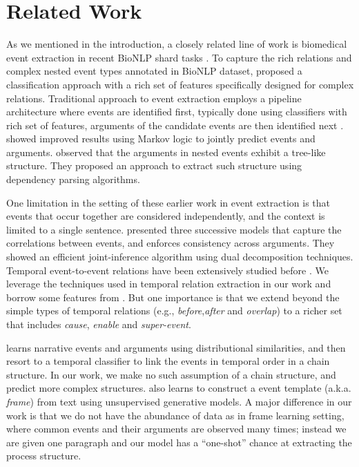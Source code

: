 \section{Related Work}
As we mentioned in the introduction, a closely related line of work is biomedical event extraction in recent BioNLP shard tasks \cite{kim09,kim11}. 
To capture the rich relations and complex nested event types annotated in BioNLP dataset,  proposed a classification approach with a rich set of features specifically designed for complex relations. 
Traditional approach to event extraction employs a pipeline architecture where events are identified first, typically done using classifiers with rich set of features\cite{Miwa10}, arguments of the candidate events are then identified next \cite{Bjorne11}. 
 showed improved results using Markov logic to jointly predict events and arguments. 
 observed that the arguments in nested events exhibit a tree-like structure. They proposed an approach to extract such structure using dependency parsing algorithms.

One limitation in the setting of these earlier work in event extraction is that events that occur together are considered independently, and the context is limited to a single sentence.  presented three successive models that capture the correlations between events, and enforces consistency across arguments. They showed an efficient joint-inference algorithm using dual decomposition techniques. 
Temporal event-to-event relations have been extensively studied before \cite{Chambers07,Chambers08,DSouzaNg:13a}. We leverage the  techniques used in temporal relation extraction in our work and borrow some features from \cite{Chambers07}. But one importance is that we extend beyond the simple types of temporal relations (e.g., \textit{before},\textit{after} and \textit{overlap}) to a richer set that includes \textit{cause}, \textit{enable} and \textit{super-event}.

  learns narrative events and arguments using distributional similarities, and then resort to a temporal classifier to link the events in temporal order in a chain structure. In our work, we make no such assumption of a chain structure, and predict more complex structures.  also learns to construct a event template (a.k.a. \textit{frame}) from text using unsupervised generative models. A major difference in our work is that we do not have the abundance of data as in frame learning setting, where common events and their arguments are observed many times; instead we are given one paragraph and our model has a ``one-shot'' chance at extracting the process structure.
 
